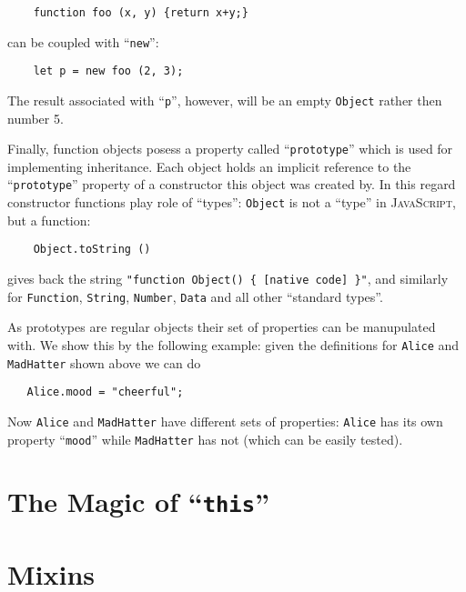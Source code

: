 \documentclass{article}
\newcommand{\js}{\textsc{JavaScript}\xspace}
\begin{document}
\begin{lstlisting}
    function foo (x, y) {return x+y;}
\end{lstlisting}

can be coupled with ``\lstinline|new|'':

\begin{lstlisting}
    let p = new foo (2, 3);
\end{lstlisting}

The result associated with ``\lstinline|p|'', however, will be an empty \lstinline|Object| rather then number 5.

Finally, function objects posess a property called ``\lstinline|prototype|'' which is used for implementing
inheritance. Each object holds an implicit reference to the ``\lstinline|prototype|''
property of a constructor this object was created by. In this regard constructor functions play role of ``types'':
\lstinline|Object| is not a ``type'' in \js, but a function:

\begin{lstlisting}
    Object.toString ()
\end{lstlisting}

gives back the string \lstinline|"function Object() { [native code] }"|, and similarly for \lstinline|Function|,
\lstinline|String|, \lstinline|Number|, \lstinline|Data| and  all other ``standard types''.

As prototypes are regular objects their set of properties can be manupulated with. We show this by the following
example: given the definitions for \lstinline|Alice| and \lstinline|MadHatter| shown above we can do

\begin{lstlisting}
   Alice.mood = "cheerful";
\end{lstlisting}

Now \lstinline|Alice| and \lstinline|MadHatter| have different sets of properties: \lstinline|Alice| has its
own property ``\lstinline|mood|'' while \lstinline|MadHatter| has not (which can be easily
tested). 

\section{The Magic of ``\lstinline[basicstyle=\normal]|this|''}
\label{sec:this}

\section{Mixins}
\end{document}
